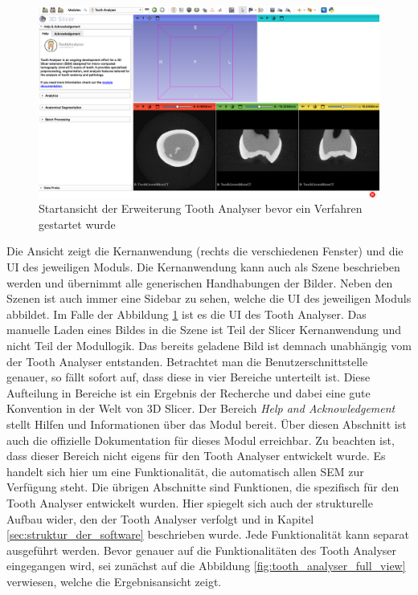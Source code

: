 \begin{figure}[h]
	\centering
	\includegraphics[width=\textwidth]{img/toothAnalyserStartup.png}
	\caption{Startansicht der Erweiterung Tooth Analyser bevor ein Verfahren
	gestartet wurde}
	\label{fig:tooth_analyser_start_up}
\end{figure}

Die Ansicht zeigt die Kernanwendung (rechts die verschiedenen Fenster) und die \ac{UI}
des jeweiligen Moduls. Die Kernanwendung kann auch als Szene beschrieben werden und
übernimmt alle generischen Handhabungen der Bilder. Neben den Szenen ist auch
immer eine Sidebar zu sehen, welche die \ac{UI} des jeweiligen Moduls abbildet. Im
Falle der Abbildung \ref{fig:tooth_analyser_start_up} ist es die \ac{UI} des
Tooth Analyser. Das manuelle Laden eines Bildes in die Szene ist Teil der Slicer
Kernanwendung und nicht Teil der Modullogik. Das bereits geladene Bild ist
demnach unabhängig vom der Tooth Analyser entstanden. Betrachtet man die Benutzerschnittstelle
genauer, so fällt sofort auf, dass diese in vier Bereiche unterteilt ist. Diese
Aufteilung in Bereiche ist ein Ergebnis der Recherche und dabei eine gute
Konvention in der Welt von 3D Slicer. Der Bereich \textit{Help and
Acknowledgement} stellt Hilfen und Informationen über das Modul bereit. Über diesen
Abschnitt ist auch die offizielle Dokumentation für dieses Modul erreichbar. Zu
beachten ist, dass dieser Bereich nicht eigens für den Tooth Analyser entwickelt
wurde. Es handelt sich hier um eine Funktionalität, die automatisch allen \ac{SEM}
zur Verfügung steht. Die übrigen Abschnitte sind Funktionen, die spezifisch für
den Tooth Analyser entwickelt wurden. Hier spiegelt sich auch der strukturelle Aufbau
wider, den der Tooth Analyser verfolgt und in Kapitel
\ref{sec:struktur_der_software} beschrieben wurde. Jede Funktionalität kann separat
ausgeführt werden. Bevor genauer auf die Funktionalitäten des Tooth Analyser
eingegangen wird, sei zunächst auf die Abbildung \ref{fig:tooth_analyser_full_view}
verwiesen, welche die Ergebnisansicht zeigt.

